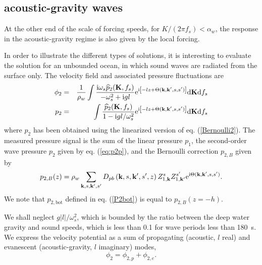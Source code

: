 \subsection{acoustic-gravity waves}
At the other end of the scale of forcing speeds, for $K/(2\pi f_s)< \alpha_w$, the response in the acoustic-gravity regime is also given by the local forcing. 

In order to illustrate the different types of solutions, it is interesting to evaluate the solution for an 
unbounded ocean, 
in which sound waves are radiated from the surface only. 
The velocity field and associated pressure fluctuations are 
\begin{eqnarray}
\phi_{2}&=& \frac{1}{\rho_w} \int  \frac{ \mathrm{i} \omega_s \widehat{p}_{2}(\mathbf{K},f_s) }{- \omega_s^2 +  \mathrm{i}  g  l} \mathrm{e}^{\mathrm{i}\left[-lz +
    \Theta(\mathbf{k},\mathbf{k^{\prime}},s,s')\right]}  {\mathrm d}\mathbf{K}   {\mathrm d}f_s 
 \\
p_{2}&=&\int   \frac{\widehat{p}_{2}(\mathbf{K},f_s) }{1 - \mathrm{i} g  l/\omega_s^2}  \mathrm{e}^{\mathrm{i}\left[-lz +
    \Theta(\mathbf{k},\mathbf{k^{\prime}},s,s')\right]} {\mathrm d}\mathbf{K}   {\mathrm d}f_s  \label{eq:p2p}
\end{eqnarray}
where $p_{2}$ has been obtained using the linearized version of eq. (\ref{Bernoulli2}). The 
measured pressure signal is the sum of the linear pressure $p_1$, the second-order wave pressure $p_{2}$ given by eq. (\ref{eq:p2p}), and the 
Bernoulli correction $p_{2,B}$ given by
\begin{equation}
 p_{2,B}(z)= \rho_w \sum_{\mathbf{k},s,\mathbf{k^{\prime}},s'}  D_{pb} \left(\mathbf{k},s,\mathbf{k^{\prime}},s',z\right) Z_{1,\mathbf{k}}^{s} Z_{1,\mathbf{k^{\prime}}}^{s'} 
 \mathrm{e}^{\mathrm{i}
     \Theta(\mathbf{k},\mathbf{k^{\prime}},s,s')}\label{P2B}.
\end{equation}
We note that  $p_{2,\mathrm{bot}}$ defined in eq. (\ref{P2bot}) is equal to $p_{2,B}(z=-h)$. 

 
We shall neglect $  g |l|/\omega_s^2$, which is bounded by the ratio between the deep water gravity and sound speeds, which is less than 0.1 
for wave periods less than 180~s. We express
the velocity potential as a sum of propagating (acoustic, $l$ real) and evanescent (acoustic-gravity, $l$ imaginary) modes, 
\begin{equation}
   \phi_2 = \phi_{2,p} + \phi_{2,e}.
 \end{equation}

